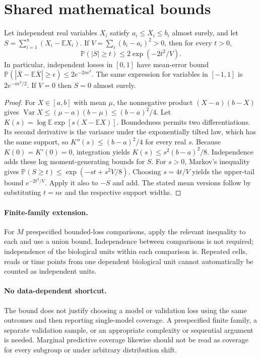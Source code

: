 \documentclass[11pt]{article}
\begin{document}
\section{Shared mathematical bounds}\label{app:bounds}
\begin{lemma}\label{lem:bounded}
Let independent real variables $X_i$ satisfy $a_i\leq X_i\leq b_i$ almost surely,
and let $S=\sum_{i=1}^n(X_i-\mathbb{E} X_i)$. If
$V=\sum_i(b_i-a_i)^2>0$, then for every $t>0$,
\[
 \mathbb{P}(|S|\geq t)\leq 2\exp(-2t^2/V).
\]
In particular, independent losses in $[0,1]$ have mean-error bound
$\mathbb{P}(|\overline X-\mathbb{E}\overline X|\geq\epsilon)
\leq2e^{-2n\epsilon^2}$. The same expression for variables in $[-1,1]$
is $2e^{-n\epsilon^2/2}$. If $V=0$ then $S=0$ almost surely.
\end{lemma}
\begin{proof}
For $X\in[a,b]$ with mean $\mu$, the nonnegative product
$(X-a)(b-X)$ gives
$\operatorname{Var} X\leq(\mu-a)(b-\mu)\leq(b-a)^2/4$.
Let $K(s)=\log\mathbb{E}\exp[s(X-\mathbb{E} X)]$.
Boundedness permits two differentiations. Its second derivative is the variance
under the exponentially tilted law, which has the same support, so
$K''(s)\leq(b-a)^2/4$ for every real $s$.
Because $K(0)=K'(0)=0$, integration yields
$K(s)\leq s^2(b-a)^2/8$.
Independence adds these log moment-generating bounds for $S$.
For $s>0$, Markov's inequality gives
$\mathbb{P}(S\geq t)\leq\exp(-st+s^2V/8)$.
Choosing $s=4t/V$ yields the upper-tail bound $e^{-2t^2/V}$.
Apply it also to $-S$ and add. The stated mean versions follow by substituting
$t=n\epsilon$ and the respective support widths.
\end{proof}

\paragraph{Finite-family extension.}
For $M$ prespecified bounded-loss comparisons, apply the relevant inequality to
each and use a union bound. Independence between comparisons is not required;
independence of the biological units within each comparison is. Repeated cells,
reads or time points from one dependent biological unit cannot automatically be
counted as independent units.

\paragraph{No data-dependent shortcut.}
The bound does not justify choosing a model or validation loss using the same
outcomes and then reporting single-model coverage. A prespecified finite family,
a separate validation sample, or an appropriate complexity or sequential argument
is needed. Marginal predictive coverage likewise should not be read as coverage
for every subgroup or under arbitrary distribution shift.
\end{document}
